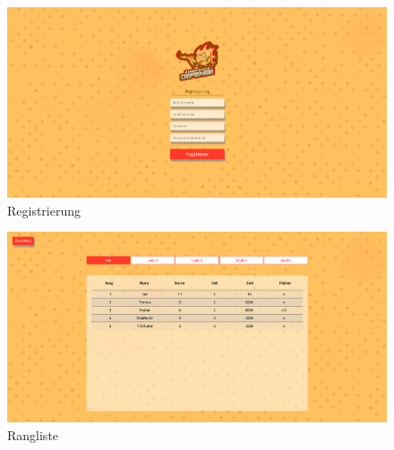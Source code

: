 \documentclass[letterpaper, 10 pt, conference]{ieeeconf}
\begin{document}
\newpage

\begin{figure}[ht]
	\centering
	\includegraphics[width=\linewidth]{images/registration}
	\caption{Registrierung}
	\label{fig:registration}
\end{figure}

\begin{figure}[ht]
	\centering
	\includegraphics[width=\linewidth]{images/scoreboard}
	\caption{Rangliste}
	\label{fig:scoreboard}
\end{figure}
\end{document}
